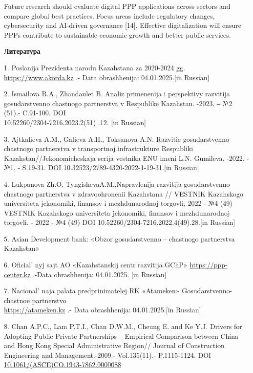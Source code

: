 \begin{multicols}{2}
Future research should evaluate digital PPP applications across sectors
and compare global best practices. Focus areas include regulatory
changes, cybersecurity and AI-driven governance {[}14{]}. Effective
digitalization will ensure PPPs contribute to sustainable economic
growth and better public services.
\end{multicols}

\begin{center}
{\bfseries Литература}
\end{center}

\begin{references}
1. Poslanija Prezidenta narodu Kazahstana za 2020-2024 gg.
\href{https://www.akorda.kz/ru/addresses}{https://www.akorda.kz} .- Data obrashhenija: 04.01.2025.{[}in
Russian{]}

2. Ismailova R.A., Zhandaulet B. Analiz primenenija i perspektivy
razvitija gosudarstvenno chastnogo partnerstva v Respublike Kazahstan.
-2023. ‒ №2 (51).- C.91-100. DOI \\10.52260/2304-7216.2023.2(51) .12. {[}in
Russian{]}

3. Ajtkalieva A.M., Galieva A.H., Toksanova A.N. Razvitie gosudarstvenno
chastnogo partnerstva v transp\-ortnoj infrastrukture Respubliki
Kazahstan//Jekonomicheskaja serija vestnika ENU imeni L.N. Gumileva.
-2022. -№1. - S.19-31. DOI 10.32523/2789-4320-2022-1-19-31.{[}in
Russian{]}

4. Lukpanova Zh.O, TyngishevaA.M.,Napravlenija razvitija gosudarstvenno
chastnogo partnerstva v zdra\-voohronenii Kazahstana // VESTNIK Kazahskogo
universiteta jekonomiki, finansov i mezhdunarodnoj torgovli, 2022 - №4
(49) VESTNIK Kazahskogo universiteta jekonomiki, finansov i
mezhdunarodnoj torgovli. - 2022 - №4 (49) DOI
10.52260/2304-7216.2022.4(49).28.{[}in Russian{]}

5. Asian Development bank: «Obzor gosudarstvenno -- chastnogo
partnerstva Kazahstan»

6. Oficial' nyj sajt AO «Kazahstanskij centr razvitija
GChP» \href{https://ppp-center.kz/}{https://ppp-center.kz} .-Data obrashhenija: 04.01.2025. {[}in
Russian{]}

7. Nacional' naja palata predprinimatelej RK «Atameken»
Gosudarstvenno-chastnoe partnerstvo\\
\href{https://atameken.kz/ru/services/18-gosudarstvenno-chastnoe-partnerstvo}{https://atameken.kz} .- Data
obrashhenija: 04.01.2025.{[}in Russian{]}

8. Chan A.P.C., Lam P.T.I., Chan D.W.M., Cheung E. and Ke Y.J. Drivers
for Adopting Public Private Partnerships -- Empirical Comparison between
China and Hong Kong Special Administrative Region// Journal of
Construction Engineering and Management.-2009.- Vol.135(11).-
P.1115-1124. DOI\\
\href{http://dx.doi.org/10.1061/(ASCE)CO.1943-7862.0000088}{10.1061/(ASCE)CO.1943-7862.0000088}


\end{references}
